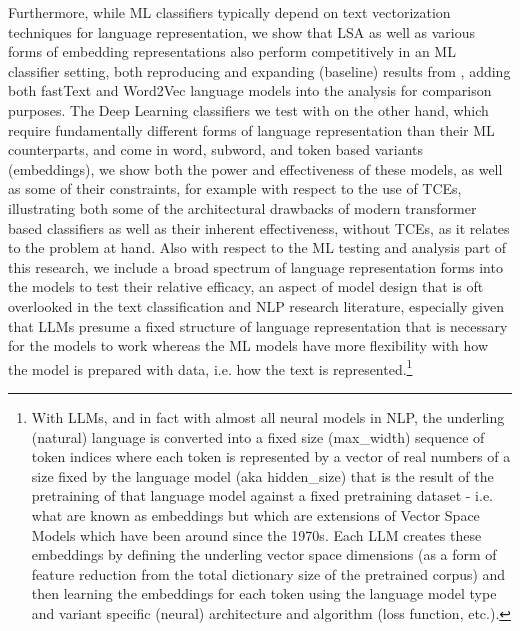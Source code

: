 \documentclass[final]{clv2025}
\begin{document}
Furthermore, while ML classifiers typically depend on text vectorization techniques for language representation, we show that LSA as well as various forms of embedding representations also perform competitively in an ML classifier setting, both reproducing and expanding (baseline) results from \cite{moreo2021}, adding both fastText and Word2Vec language models into the analysis for comparison purposes. The Deep Learning classifiers we test with on the other hand, which require fundamentally different forms of language representation than their ML counterparts, and come in word, subword, and token based variants (embeddings), we show both the power and effectiveness of these models, as well as some of their constraints, for example with respect to the use of TCEs, illustrating both some of the architectural drawbacks of modern transformer based classifiers as well as their inherent effectiveness, without TCEs, as it relates to the problem at hand. Also with respect to the ML testing and analysis part of this research, we include a broad spectrum of language representation forms into the models to test their relative efficacy, an aspect of model design that is oft overlooked in the text classification and NLP research literature, especially given that LLMs presume a fixed structure of language representation that is necessary for the models to work whereas the ML models have more flexibility with how the model is prepared with data, i.e. how the text is represented.\footnote{With LLMs, and in fact with almost all neural models in NLP, the underling (natural) language is converted into a fixed size (max\_width) sequence of token indices where each token is represented by a vector of real numbers of a size fixed by the language model (aka hidden\_size) that is the result of the pretraining of that language model against a fixed pretraining dataset - i.e. what are known as embeddings but which are extensions of Vector Space Models which have been around since the 1970s. Each LLM creates these embeddings by defining the underling vector space dimensions (as a form of feature reduction from the total dictionary size of the pretrained corpus) and then learning the embeddings for each token using the language model type and variant specific (neural) architecture and algorithm (loss function, etc.).} 
\end{document}
